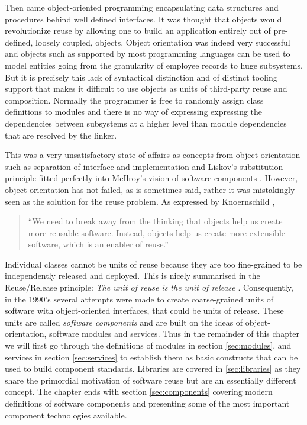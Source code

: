 Then came object-oriented programming encapsulating data structures and procedures behind well defined interfaces. It was thought that
objects would revolutionize reuse by allowing one to build an application entirely out of pre-defined, loosely coupled, objects. 
Object orientation was indeed very successful and objects such as supported by most programming languages can be used to model
entities going from the granularity of employee records to huge subsystems. But it is precisely this lack of syntactical distinction and
of distinct tooling support that makes it difficult to use objects as units of third-party reuse and composition. Normally the programmer is
free to randomly assign class definitions to modules and there is no way of expressing expressing the dependencies between subsystems
at a higher level than module dependencies that are resolved by the linker.

This was a very unsatisfactory state of affairs as concepts from object orientation such as separation of interface and implementation
and Liskov's substitution principle fitted perfectly into McIlroy's vision of software components \cite{Liskov}. However, object-orientation
has not failed, as is sometimes said, rather it was mistakingly seen as the solution for the reuse problem. As expressed by Knoernschild
\cite{Knoernschild},

\begin{quotation}
``We need to break away from the thinking that objects help us create more reusable software.
Instead, objects help us create more extensible software, which is an enabler of reuse.''
\end{quotation}

Individual classes cannot be units of reuse because they are too fine-grained to be independently released and deployed. This
is nicely summarised in the Reuse/Release principle: \emph{The unit of reuse is the unit of release} \cite{Martin}.
Consequently, in the 1990's several attempts were made to create coarse-grained units of software with object-oriented interfaces,
that could be units of release. These units are called \emph{software components} and are built on the ideas of object-orientation,
software modules and services. Thus in the remainder of this chapter we will first go through the definitions of modules in section
\ref{sec:modules}, and services in section \ref{sec:services} to establish them as basic constructs that can be used to build
component standards. Libraries are covered in \ref{sec:libraries} as they share the primordial motivation of software reuse but
are an essentially different concept. The chapter ends with section \ref{sec:components} covering modern definitions of software
components and presenting some of the most important component technologies available.


